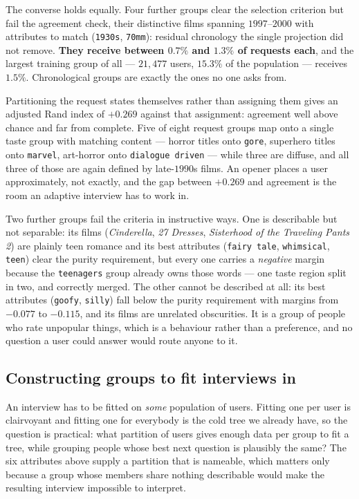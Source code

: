 \documentclass[11pt]{article}
\begin{document}
The converse holds equally. Four further groups clear the selection criterion but fail the agreement
check, their distinctive films spanning $1997$--$2000$ with attributes to match (\texttt{1930s},
\texttt{70mm}): residual chronology the single projection did not remove. \textbf{They receive
between $0.7\%$ and $1.3\%$ of requests each}, and the largest training group of all --- $21{,}477$
users, $15.3\%$ of the population --- receives $1.5\%$. Chronological groups are exactly the ones
no one asks from.

Partitioning the request states themselves rather than assigning them gives an adjusted Rand index of
$+0.269$ against that assignment: agreement well above chance and far from complete. Five of eight
request groups map onto a single taste group with matching content --- horror titles onto
\texttt{gore}, superhero titles onto \texttt{marvel}, art-horror onto \texttt{dialogue driven} ---
while three are diffuse, and all three of those are again defined by late-$1990$s films. An opener
places a user approximately, not exactly, and the gap between $+0.269$ and agreement is the room an
adaptive interview has to work in.

Two further groups fail the criteria in instructive ways. One is describable but not separable: its films
(\emph{Cinderella}, \emph{27 Dresses}, \emph{Sisterhood of the Traveling Pants 2}) are plainly teen
romance and its best attributes (\texttt{fairy tale}, \texttt{whimsical}, \texttt{teen}) clear the
purity requirement, but every one carries a \emph{negative} margin because the \texttt{teenagers}
group already owns those words --- one taste region split in two, and correctly merged. The other
cannot be described at all: its best attributes (\texttt{goofy}, \texttt{silly}) fall below the
purity requirement with margins from $-0.077$ to $-0.115$, and its films are unrelated obscurities.
It is a group of people who rate unpopular things, which is a behaviour rather than a preference,
and no question a user could answer would route anyone to it.

\subsection{Constructing groups to fit interviews in}
\label{sec:partition}

An interview has to be fitted on \emph{some} population of users. Fitting one per user is
clairvoyant and fitting one for everybody is the cold tree we already have, so the question is
practical: what partition of users gives enough data per group to fit a tree, while grouping people
whose best next question is plausibly the same? The six attributes above supply a partition that is
nameable, which matters only because a group whose members share nothing describable would make the
resulting interview impossible to interpret.
\end{document}
